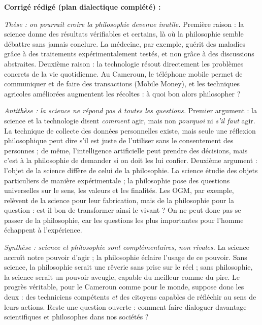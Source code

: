 \documentclass[11pt]{article}
\begin{document}
\begin{corrige}
\textbf{Corrigé rédigé (plan dialectique complété) :}

\emph{Thèse : on pourrait croire la philosophie devenue inutile.} Première raison : la science donne des résultats vérifiables et certains, là où la philosophie semble débattre sans jamais conclure. La médecine, par exemple, guérit des maladies grâce à des traitements expérimentalement testés, et non grâce à des discussions abstraites. Deuxième raison : la technologie résout directement les problèmes concrets de la vie quotidienne. Au Cameroun, le téléphone mobile permet de communiquer et de faire des transactions (Mobile Money), et les techniques agricoles améliorées augmentent les récoltes : à quoi bon alors philosopher ?

\emph{Antithèse : la science ne répond pas à toutes les questions.} Premier argument : la science et la technologie disent \emph{comment} agir, mais non \emph{pourquoi} ni \emph{s'il faut} agir. La technique de collecte des données personnelles existe, mais seule une réflexion philosophique peut dire s'il est juste de l'utiliser sans le consentement des personnes ; de même, l'intelligence artificielle peut prendre des décisions, mais c'est à la philosophie de demander si on doit les lui confier. Deuxième argument : l'objet de la science diffère de celui de la philosophie. La science étudie des objets particuliers de manière expérimentale ; la philosophie pose des questions universelles sur le sens, les valeurs et les finalités. Les OGM, par exemple, relèvent de la science pour leur fabrication, mais de la philosophie pour la question : est-il bon de transformer ainsi le vivant ? On ne peut donc pas se passer de la philosophie, car les questions les plus importantes pour l'homme échappent à l'expérience.

\emph{Synthèse : science et philosophie sont complémentaires, non rivales.} La science accroît notre pouvoir d'agir ; la philosophie éclaire l'usage de ce pouvoir. Sans science, la philosophie serait une rêverie sans prise sur le réel ; sans philosophie, la science serait un pouvoir aveugle, capable du meilleur comme du pire. Le progrès véritable, pour le Cameroun comme pour le monde, suppose donc les deux : des techniciens compétents \emph{et} des citoyens capables de réfléchir au sens de leurs actions. Reste une question ouverte : comment faire dialoguer davantage scientifiques et philosophes dans nos sociétés ?


\end{corrige}
\end{document}
